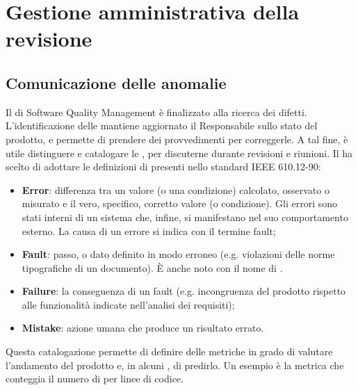 \newpage
\section{Gestione amministrativa della revisione}
\subsection{Comunicazione delle anomalie}
Il  di Software Quality Management è finalizzato alla ricerca dei difetti. L'identificazione delle  mantiene aggiornato il Responsabile sullo stato del prodotto, e permette di prendere dei provvedimenti per correggerle. A tal fine, è utile distinguere e catalogare le , per discuterne durante revisioni e riunioni. Il  ha scelto di adottare le definizioni di  presenti nello standard IEEE 610.12-90:
\begin{itemize}
\item \textbf{Error}: differenza tra un valore (o una condizione) calcolato, osservato o misurato e il vero, specifico, corretto valore (o condizione). Gli errori sono stati interni di un sistema che, infine, si manifestano nel suo comportamento esterno. La causa di un errore si indica con il termine fault;
\item \textbf{Fault}: passo,  o dato definito in modo erroneo (e.g. violazioni delle norme tipografiche di un documento). \`E anche noto con il nome di .
\item \textbf{Failure}: la conseguenza di un fault (e.g. incongruenza del prodotto rispetto alle funzionalità indicate nell'analisi dei requisiti);
\item \textbf{Mistake}: azione umana che produce un risultato errato.
\end{itemize}
Questa catalogazione permette di definire delle metriche in grado di valutare l'andamento del prodotto e, in alcuni , di predirlo. Un esempio è la metrica che conteggia il numero di  per linee di codice.

